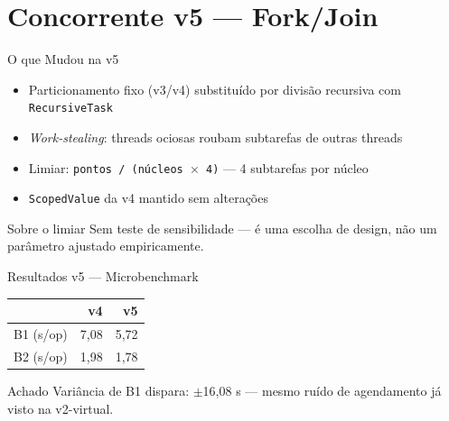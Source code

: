 \section{Concorrente v5 --- Fork/Join}

\begin{frame}{O que Mudou na v5}
    \begin{itemize}
        \item Particionamento fixo (v3/v4) substituído por divisão recursiva
              com \texttt{RecursiveTask}
        \item \textit{Work-stealing}: threads ociosas roubam subtarefas de
              outras threads
        \item Limiar: \texttt{pontos / (núcleos $\times$ 4)} --- 4 subtarefas
              por núcleo
        \item \texttt{ScopedValue} da v4 mantido sem alterações
    \end{itemize}

    \vspace{0.8em}
    \begin{block}{Sobre o limiar}
        Sem teste de sensibilidade --- é uma escolha de design, não um
        parâmetro ajustado empiricamente.
    \end{block}
\end{frame}

\begin{frame}{Resultados v5 --- Microbenchmark}
    \begin{center}
    \begin{tabular}{lrr}
        \toprule
        & \textbf{v4} & \textbf{v5} \\
        \midrule
        B1 (s/op) & 7,08 & 5,72 \\
        B2 (s/op) & 1,98 & \alert{1,78} \\
        \bottomrule
    \end{tabular}
    \end{center}

    \vspace{0.8em}
    \begin{alertblock}{Achado}
        Variância de B1 dispara: \alert{$\pm$16,08 s} --- mesmo ruído de
        agendamento já visto na v2-virtual.
    \end{alertblock}
\end{frame}

